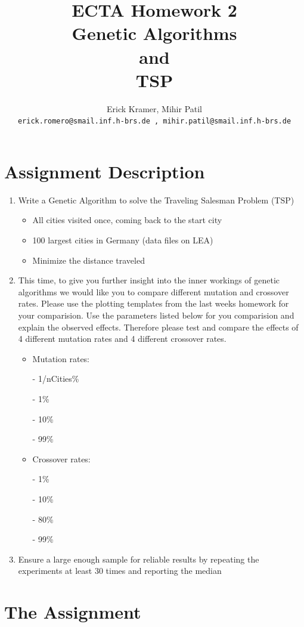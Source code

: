 \documentclass{article}
\title{ECTA Homework 2\\Genetic Algorithms\\and\\TSP}
\author{\color{blue}Erick Kramer, Mihir Patil\\ \texttt{\color{blue}erick.romero@smail.inf.h-brs.de , mihir.patil@smail.inf.h-brs.de}}
\begin{document}
\maketitle

\section{Assignment Description}
	\begin{enumerate}
		\item{Write a Genetic Algorithm to solve the Traveling Salesman Problem (TSP)}
		\begin{itemize}
			\item{All cities visited once, coming back to the start city}
			\item{100 largest cities in Germany (data files on LEA)}
			\item{Minimize the distance traveled}
		\end{itemize}
		\item{This time, to give you further insight into the inner workings of genetic algorithms we would like you to compare different mutation and crossover rates. Please use the plotting templates from the last weeks homework for your comparision. Use the parameters listed below for you comparision and explain the observed effects. Therefore please test and compare the effects of 4 different mutation rates and 4 different crossover rates.}
		\begin{itemize}
			\item{Mutation rates:}
			\item[-]{1/nCities\%}
			\item[-]{1\%}
			\item[-]{10\%}
			\item[-]{99\%}
			\item{Crossover rates:}
			\item[-]{1\%}
			\item[-]{10\%}
			\item[-]{80\%}
			\item[-]{99\%}
		\end{itemize}
		\item{Ensure a large enough sample for reliable results by repeating the experiments at least 30 times and reporting the median}
	\end{enumerate}


\section{The Assignment}
\end{document}

